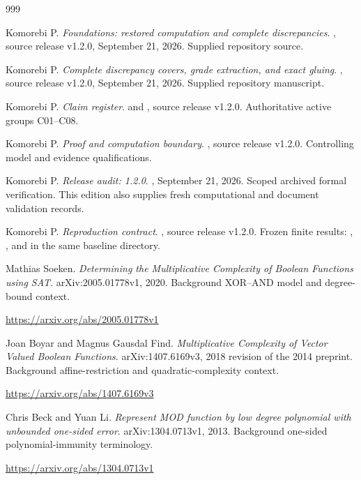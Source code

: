 \begin{thebibliography}{999}

 Komorebi P. \emph{Foundations: restored computation and complete discrepancies}. , source release v1.2.0, September 21, 2026. Supplied repository source.

 Komorebi P. \emph{Complete discrepancy covers, grade extraction, and exact gluing}. , source release v1.2.0, September 21, 2026. Supplied repository manuscript.

 Komorebi P. \emph{Claim register}.  and , source release v1.2.0. Authoritative active groups C01--C08.

 Komorebi P. \emph{Proof and computation boundary}. , source release v1.2.0. Controlling model and evidence qualifications.

 Komorebi P. \emph{Release audit: 1.2.0}. , September 21, 2026. Scoped archived formal verification. This edition also supplies fresh computational and document validation records.

 Komorebi P. \emph{Reproduction contract}. , source release v1.2.0. Frozen finite results: , , and  in the same baseline directory.

 Mathias Soeken. \emph{Determining the Multiplicative Complexity of Boolean Functions using SAT}. arXiv:2005.01778v1, 2020. Background XOR--AND model and degree-bound context.\par\url{https://arxiv.org/abs/2005.01778v1}

 Joan Boyar and Magnus Gausdal Find. \emph{Multiplicative Complexity of Vector Valued Boolean Functions}. arXiv:1407.6169v3, 2018 revision of the 2014 preprint. Background affine-restriction and quadratic-complexity context.\par\url{https://arxiv.org/abs/1407.6169v3}

 Chris Beck and Yuan Li. \emph{Represent MOD function by low degree polynomial with unbounded one-sided error}. arXiv:1304.0713v1, 2013. Background one-sided polynomial-immunity terminology.\par\url{https://arxiv.org/abs/1304.0713v1}

\end{thebibliography}
